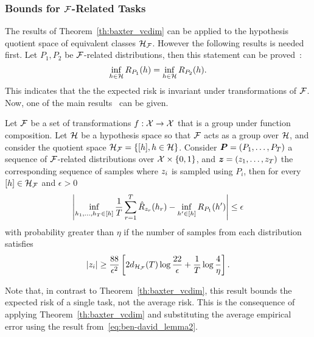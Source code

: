 \subsubsection*{Bounds for $\mathcal{F}$-Related Tasks}
The results of Theorem~\ref{th:baxter_vcdim} can be applied to the hypothesis quotient space of equivalent classes $\mathcal{H}_{\mathcal{F}}$. However the following results is needed first.
%
Let $P_1, P_2$ be $\mathcal{F}$-related distributions, then this statement can be proved~\cite[Lemma~2]{Ben-DavidB08}:
\begin{equation}
    \label{eq:ben-david_lemma2}
    \inf_{\hypf \in \hypspace} \risk_{P_1}(\hypf) = \inf_{\hypf \in \hypspace} \risk_{P_2}(\hypf).
\end{equation}
This indicates that the the expected risk is invariant under transformations of $\mathcal{F}$.
Now, one of the main results~\cite[Theorem~2]{baxter2000model} can be given.
\begin{theorem}\label{th:ben-david_th2}
    Let $\mathcal{F}$ be a set of transformations $f: \mathcal{X} \to \mathcal{X}$ that is a group under function composition. Let $\mathcal{H}$ be a hypothesis space so that $\mathcal{F}$ acts as a group over $\mathcal{H}$, and consider the quotient space $\mathcal{H}_{\mathcal{F}} = \left\{\lbrack h\rbrack, h \in \mathcal{H}\right\}$.
    Consider $\bm{P} = (P_1, \ldots, P_T)$ a sequence of $\mathcal{F}$-related distributions over $\mathcal{X} \times \left\{0, 1\right\}$, and $\bm{z} = (z_1, \ldots, z_T)$ the corresponding sequence of samples  where $z_i$ is sampled using $P_i$, then for every $\lbrack h\rbrack \in \mathcal{H}_{\mathcal{F}}$ and $\epsilon > 0$ 
    \begin{equation}
        \nonumber
        \left|\inf_{h_1, \ldots, h_T \in \lbrack h\rbrack} \frac{1}{T} \sum_{r=1}^T \hat{R}_{z_r}(h_r) - \inf_{h' \in \lbrack h\rbrack}R_{P_1}(h')\right|  \leq \epsilon
    \end{equation}
    with probability greater than $\eta$ if the number of samples from each distribution satisfies
    \begin{equation}
        \label{eq:ben-david_sample_inequality}
        \cardinal{\sample_i} \geq  \frac{88}{\epsilon^2} \left[2 d_{\hypspace_\frelset}(\ntasks) \log \frac{22}{\epsilon} + \frac{1}{\ntasks}\log\frac{4}{\eta} \right].
    \end{equation}
\end{theorem}
Note that, in contrast to Theorem~\ref{th:baxter_vcdim}, this result bounds the expected risk of a single task, not the average risk. This is the consequence of applying Theorem~\ref{th:baxter_vcdim} and substituting the average empirical error using the result from~\eqref{eq:ben-david_lemma2}.

